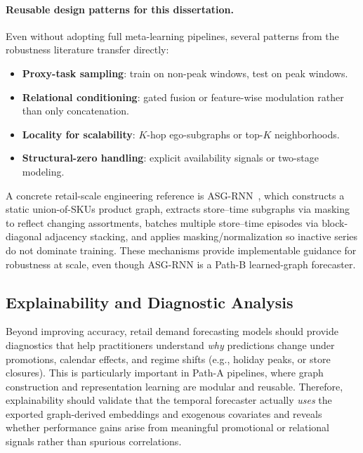 \paragraph{Reusable design patterns for this dissertation.}
Even without adopting full meta-learning pipelines, several patterns from the robustness literature transfer directly:
\begin{itemize}
  \item \textbf{Proxy-task sampling}: train on non-peak windows, test on peak windows.
  \item \textbf{Relational conditioning}: gated fusion or feature-wise modulation rather than only concatenation.
  \item \textbf{Locality for scalability}: $K$-hop ego-subgraphs or top-$K$ neighborhoods.
  \item \textbf{Structural-zero handling}: explicit availability signals or two-stage modeling.
\end{itemize}

A concrete retail-scale engineering reference is ASG-RNN~\cite{MA2024123727}, which constructs a static union-of-SKUs
product graph, extracts store--time subgraphs via masking to reflect changing assortments, batches multiple store--time
episodes via block-diagonal adjacency stacking, and applies masking/normalization so inactive series do not dominate
training. These mechanisms provide implementable guidance for robustness at scale, even though ASG-RNN is a Path-B
learned-graph forecaster.

\subsection{Explainability and Diagnostic Analysis}
\label{ss:explainability}

Beyond improving accuracy, retail demand forecasting models should provide diagnostics that help practitioners understand \emph{why} predictions change under promotions, calendar effects, and regime shifts (e.g., holiday peaks, or store closures). This is particularly important in Path-A pipelines, where graph construction and representation learning are modular and reusable. Therefore, explainability should validate that the temporal forecaster actually \emph{uses} the exported graph-derived embeddings and exogenous covariates and  reveals whether performance gains arise from meaningful promotional or relational signals rather than spurious correlations.

